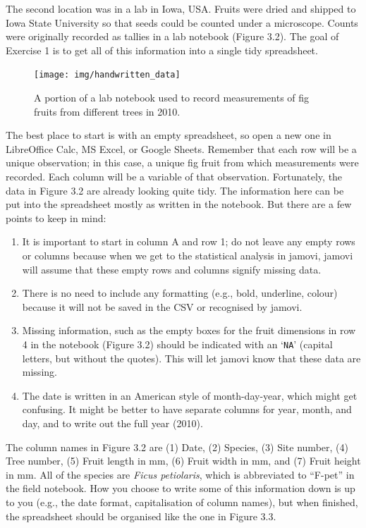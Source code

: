 \documentclass[
]{scrbook}
\providecommand{\tightlist}{%
  \setlength{\itemsep}{0pt}\setlength{\parskip}{0pt}}
\begin{document}
The second location was in a lab in Iowa, USA.
Fruits were dried and shipped to Iowa State University so that seeds could be counted under a microscope.
Counts were originally recorded as tallies in a lab notebook (Figure 3.2).
The goal of Exercise 1 is to get all of this information into a single tidy spreadsheet.

\begin{figure}
\texttt{[image: img/handwritten\_data]} \caption{A portion of a lab notebook used to record measurements of fig fruits from different trees in 2010.}\label{fig:unnamed-chunk-12}
\end{figure}

The best place to start is with an empty spreadsheet, so open a new one in LibreOffice Calc, MS Excel, or Google Sheets.
Remember that each row will be a unique observation; in this case, a unique fig fruit from which measurements were recorded.
Each column will be a variable of that observation.
Fortunately, the data in Figure 3.2 are already looking quite tidy.
The information here can be put into the spreadsheet mostly as written in the notebook.
But there are a few points to keep in mind:

\begin{enumerate}
\def\labelenumi{\arabic{enumi}.}
\tightlist
\item
  It is important to start in column A and row 1; do not leave any empty rows or columns because when we get to the statistical analysis in jamovi, jamovi will assume that these empty rows and columns signify missing data.
\item
  There is no need to include any formatting (e.g., bold, underline, colour) because it will not be saved in the CSV or recognised by jamovi.
\item
  Missing information, such as the empty boxes for the fruit dimensions in row 4 in the notebook (Figure 3.2) should be indicated with an `\texttt{NA}' (capital letters, but without the quotes). This will let jamovi know that these data are missing.
\item
  The date is written in an American style of month-day-year, which might get confusing. It might be better to have separate columns for year, month, and day, and to write out the full year (2010).
\end{enumerate}

The column names in Figure 3.2 are (1) Date, (2) Species, (3) Site number, (4) Tree number, (5) Fruit length in mm, (6) Fruit width in mm, and (7) Fruit height in mm.
All of the species are \emph{Ficus petiolaris}, which is abbreviated to ``F-pet'' in the field notebook.
How you choose to write some of this information down is up to you (e.g., the date format, capitalisation of column names), but when finished, the spreadsheet should be organised like the one in Figure 3.3.
\end{document}

